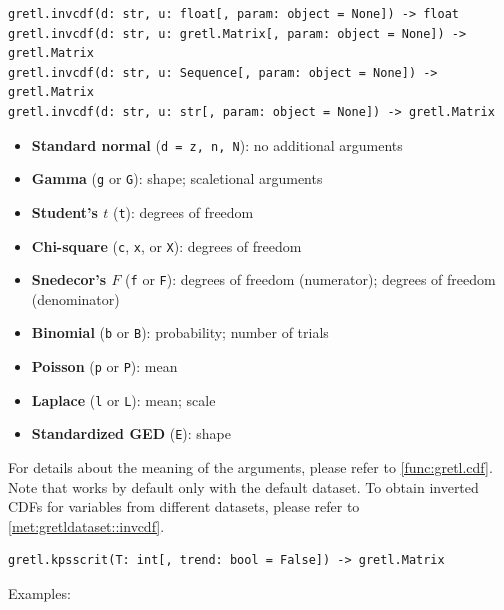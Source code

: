 \label{func:gretl.invcdf}
\begin{lstlisting}[style=pythonstylefoot]
gretl.invcdf(d: str, u: float[, param: object = None]) -> float
gretl.invcdf(d: str, u: gretl.Matrix[, param: object = None]) -> gretl.Matrix
gretl.invcdf(d: str, u: Sequence[, param: object = None]) -> gretl.Matrix
gretl.invcdf(d: str, u: str[, param: object = None]) -> gretl.Matrix
\end{lstlisting}
\begin{footnotesize}\begin{itemize}
		\item \textbf{Standard normal} (\texttt{d = z, n, N}): no additional arguments
		\item \textbf{Gamma} (\texttt{g} or \texttt{G}): shape; scaletional arguments
		\item \textbf{Student's $t$} (\texttt{t}): degrees of freedom
		\item \textbf{Chi-square} (\texttt{c}, \texttt{x}, or \texttt{X}): degrees of freedom
		\item \textbf{Snedecor's $F$} (\texttt{f} or \texttt{F}): degrees of freedom (numerator); degrees of freedom (denominator)
		\item \textbf{Binomial} (\texttt{b} or \texttt{B}): probability; number of trials
		\item \textbf{Poisson} (\texttt{p} or \texttt{P}): mean
		\item \textbf{Laplace} (\texttt{l} or \texttt{L}): mean; scale
		\item \textbf{Standardized GED} (\texttt{E}): shape
\end{itemize}\end{footnotesize}
For details about the meaning of the arguments, please
refer to \ref{func:gretl.cdf}. Note that 
works by default only with the default dataset. To obtain
inverted CDFs for variables from different datasets, please
refer to \ref{met:gretldataset::invcdf}.

\label{func:gretl.kpsscrit}
\begin{lstlisting}[style=pythonstylefoot]
gretl.kpsscrit(T: int[, trend: bool = False]) -> gretl.Matrix
\end{lstlisting}
Examples:\newline
{}\\

